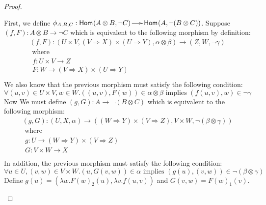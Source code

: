 \begin{proof}
\begin{itemize}
    First, we define $\phi_{A,B,C} : \mathsf{Hom}_{\mathcal{}}(A \otimes B,\lnot C) \to
    \mathsf{Hom}_{\mathcal{}}(A,\lnot (B \otimes C))$.  Suppose $(f,F) : A \otimes B
    \to \lnot C$ which is equivalent to the following morphism by
    definition:
    \[
    \begin{array}{lll}
      (f,F) : (U \times V, (V \Rightarrow X) \times (U \Rightarrow Y), \alpha \otimes \beta) \to (Z,W,\lnot \gamma)\\
      \text{ where }\\
      \begin{array}{lll}
        f : U \times V \to Z\\
        F : W \to (V \Rightarrow X) \times (U \Rightarrow Y)\\        
      \end{array}
    \end{array}
    \]
    We also know that the previous morphism must satisfy the following
    condition:
    \begin{equation}
      \label{cond:1}
      \forall (u,v) \in U \times V,w \in W.((u,v),F(w)) \in \alpha \otimes \beta \text{ implies } (f(u,v),w) \in \lnot \gamma
    \end{equation}
    Now We must define $(g,G) : A \to \lnot (B \otimes C)$ which is
    equivalent to the following morphism:
    \[
    \begin{array}{lll}
      (g,G) : (U,X,\alpha) \to ((W \Rightarrow Y) \times (V \Rightarrow Z), V \times W, \lnot (\beta \otimes \gamma))\\
      \text{ where }\\
      \begin{array}{lll}
        g : U \to (W \Rightarrow Y) \times (V \Rightarrow Z)\\
        G : V \times W \to X\\        
      \end{array}
    \end{array}
    \]
    In addition, the previous morphism must satisfy the following condition:
    \begin{equation}
      \label{cond:2}
      \forall u \in U,(v,w) \in V \times W.(u,G(v,w)) \in \alpha \text{ implies } (g(u),(v,w)) \in \lnot (\beta \otimes \gamma)
    \end{equation}
    Define $g(u) = (\lambda w.F(w)_2(u),\lambda v.f(u,v))$ and $G(v,w)
    = F(w)_1(v)$.


\end{itemize}
\end{proof}
